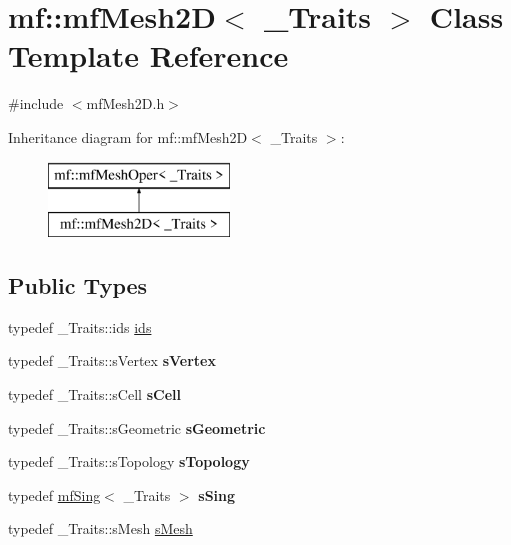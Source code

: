\hypertarget{classmf_1_1mfMesh2D}{
\section{mf::mfMesh2D$<$ \_\-Traits $>$ Class Template Reference}
\label{classmf_1_1mfMesh2D}
}


{\ttfamily \#include $<$mfMesh2D.h$>$}

Inheritance diagram for mf::mfMesh2D$<$ \_\-Traits $>$:\begin{figure}[H]
\begin{center}
\leavevmode
\includegraphics[height=2.000000cm]{classmf_1_1mfMesh2D}
\end{center}
\end{figure}
\subsection*{Public Types}
\begin{DoxyCompactItemize}
\item 
typedef \_\-Traits::ids \hyperlink{classmf_1_1mfMesh2D_a517d508b5d1959b3c697f7c393ccd068}{ids}
\item 
\hypertarget{classmf_1_1mfMesh2D_ae76d2188c161d108b11b434253ac708a}{
typedef \_\-Traits::sVertex {\bfseries sVertex}}
\label{classmf_1_1mfMesh2D_ae76d2188c161d108b11b434253ac708a}

\item 
\hypertarget{classmf_1_1mfMesh2D_ad98ffaf6cec43224918e35b7272a5168}{
typedef \_\-Traits::sCell {\bfseries sCell}}
\label{classmf_1_1mfMesh2D_ad98ffaf6cec43224918e35b7272a5168}

\item 
\hypertarget{classmf_1_1mfMesh2D_a6bfcc84cc5bd3a12e15c8255c2e36b6b}{
typedef \_\-Traits::sGeometric {\bfseries sGeometric}}
\label{classmf_1_1mfMesh2D_a6bfcc84cc5bd3a12e15c8255c2e36b6b}

\item 
\hypertarget{classmf_1_1mfMesh2D_a360cbe8e1a25a9fb4234e3028be77fe6}{
typedef \_\-Traits::sTopology {\bfseries sTopology}}
\label{classmf_1_1mfMesh2D_a360cbe8e1a25a9fb4234e3028be77fe6}

\item 
\hypertarget{classmf_1_1mfMesh2D_adcf3197707a7cdd4a121b080b97c1ce1}{
typedef \hyperlink{classmf_1_1mfSing}{mfSing}$<$ \_\-Traits $>$ {\bfseries sSing}}
\label{classmf_1_1mfMesh2D_adcf3197707a7cdd4a121b080b97c1ce1}

\item 
typedef \_\-Traits::sMesh \hyperlink{classmf_1_1mfMesh2D_aa197f7f92e5aa8e68703a5eeb3d9ae04}{sMesh}
\end{DoxyCompactItemize}
